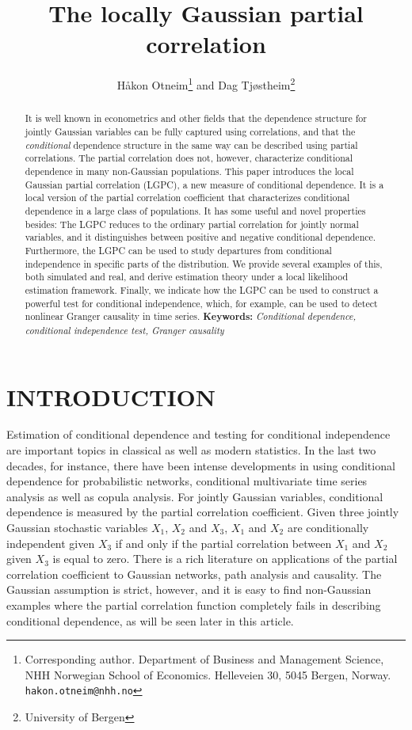 \documentclass[
  12pt,
  letterpaper]{article}
\title{The locally Gaussian partial correlation}
\author{Håkon Otneim\footnote{Corresponding author. Department of Business and Management Science, NHH Norwegian School of Economics. Helleveien 30, 5045 Bergen, Norway. \texttt{hakon.otneim@nhh.no}} and Dag Tjøstheim\footnote{University of Bergen}}
\date{}
\theoremstyle{definition}
\theoremstyle{definition}
\theoremstyle{definition}
\theoremstyle{remark}
\begin{document}
\maketitle
\begin{abstract}
It is well known in econometrics and other fields that the dependence structure for jointly Gaussian variables can be fully captured using correlations, and that the \textit{conditional} dependence structure in the same way can be described using partial correlations. The partial correlation does not, however, characterize conditional dependence in many non-Gaussian populations. This paper introduces the local Gaussian partial correlation (LGPC), a new measure of conditional dependence. It is a local version of the partial correlation coefficient that characterizes conditional dependence in a large class of populations. It has some useful and novel properties besides: The LGPC reduces to the ordinary partial correlation for jointly normal variables, and it distinguishes between positive and negative conditional dependence. Furthermore, the LGPC can be used to study departures from conditional independence in specific parts of the distribution. We provide several examples of this, both simulated and real, and derive estimation theory under a local likelihood estimation framework. Finally, we indicate how the LGPC can be used to construct a powerful test for conditional independence, which, for example, can be used to detect nonlinear Granger causality in time series. \newline \textbf{Keywords:} \emph{Conditional dependence, conditional independence test, Granger causality}
\end{abstract}

\hypertarget{introduction}{%
\section{INTRODUCTION}\label{introduction}}

Estimation of conditional dependence and testing for conditional independence are important topics in classical as well as modern statistics. In the last two decades, for instance, there have been intense developments in using conditional dependence for probabilistic networks, conditional multivariate time series analysis as well as copula analysis. For jointly Gaussian variables, conditional dependence is measured by the partial correlation coefficient. Given three jointly Gaussian stochastic variables \(X_1\), \(X_2\) and \(X_3\), \(X_1\) and \(X_2\) are conditionally independent given \(X_3\) if and only if the partial correlation between \(X_1\) and \(X_2\) given \(X_3\) is equal to zero. There is a rich literature on applications of the partial correlation coefficient to Gaussian networks, path analysis and causality. The Gaussian assumption is strict, however, and it is easy to find non-Gaussian examples where the partial correlation function completely fails in describing conditional dependence, as will be seen later in this article.
\end{document}
